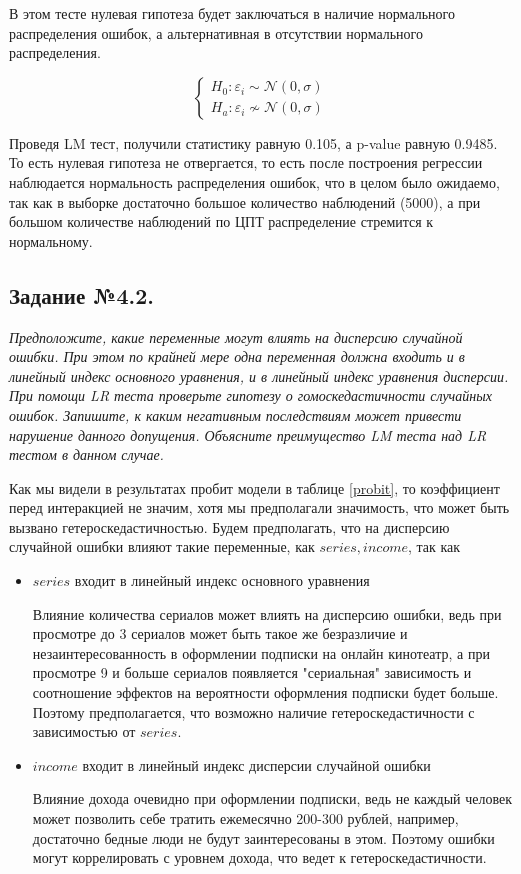 \documentclass[a4paper,12pt]{article}
\begin{document}
	В этом тесте нулевая гипотеза будет заключаться в наличие нормального распределения ошибок, а альтернативная в отсутствии нормального распределения.
	
	\begin{equation*}
		\begin{cases}
			H_0: \varepsilon_i \sim \mathcal{N} (0, \sigma)\\
			H_a: \varepsilon_i \nsim \mathcal{N} (0, \sigma)
		\end{cases}
	\end{equation*}
	
	Проведя LM тест, получили статистику равную 0.105, а p-value равную 0.9485. То есть нулевая гипотеза не отвергается, то есть после построения регрессии наблюдается нормальность распределения ошибок, что в целом было ожидаемо, так как в выборке достаточно большое количество наблюдений (5000), а при большом количестве наблюдений по ЦПТ распределение стремится к нормальному.
	
	\subsection{Задание №4.2.}
	\textit{
	Предположите, какие переменные могут влиять на дисперсию случайной ошибки. При этом по крайней мере одна переменная должна входить и в линейный индекс основного уравнения, и в линейный индекс уравнения дисперсии. При помощи LR теста проверьте гипотезу о гомоскедастичности случайных ошибок. Запишите, к каким негативным последствиям может привести нарушение данного допущения. Объясните преимущество LM теста над LR тестом в данном случае. }
	
	\vspace{0.2cm}
	
	Как мы видели в результатах пробит модели в таблице \ref{probit}, то коэффициент перед интеракцией не значим, хотя мы предполагали значимость, что может быть вызвано гетероскедастичностью. Будем предполагать, что на дисперсию случайной ошибки влияют такие переменные, как $series, income$, так как
	
	\begin{itemize}
		\item$series$ входит в линейный индекс основного уравнения
		
		Влияние количества сериалов может влиять на дисперсию ошибки, ведь при просмотре до 3 сериалов может быть такое же безразличие и незаинтересованность в оформлении подписки на онлайн кинотеатр, а при просмотре 9 и больше сериалов появляется "сериальная" зависимость и соотношение эффектов на вероятности оформления подписки будет больше. Поэтому предполагается, что возможно наличие гетероскедастичности с зависимостью от $series$.
		
		\item $income$ входит в линейный индекс дисперсии случайной ошибки
		
		Влияние дохода очевидно при оформлении подписки, ведь не каждый человек может позволить себе тратить ежемесячно 200-300 рублей, например, достаточно бедные люди не будут заинтересованы в этом. Поэтому ошибки могут коррелировать с уровнем дохода, что ведет к гетероскедастичности.
	\end{itemize}
\end{document}
